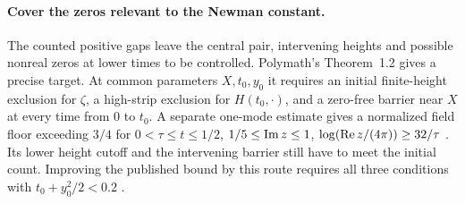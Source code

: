 \paragraph{Cover the zeros relevant to the Newman constant.}
The counted positive gaps leave the central pair, intervening heights
and possible nonreal zeros at lower times to be controlled. Polymath's
Theorem~1.2 gives a precise target. At common parameters \(X,t_0,y_0\)
it requires an initial finite-height exclusion for \(\zeta\), a high-strip
exclusion for \(H(t_0,\cdot)\), and a zero-free barrier near \(X\) at
every time from \(0\) to \(t_0\). A separate one-mode estimate gives a
normalized field floor exceeding \(3/4\) for \(0<\tau\le t\le1/2\),
\(1/5\le\operatorname{Im} z\le1\), \(\log(\operatorname{Re} z/(4\pi))\ge32/\tau\)
\cite{EZStrip}. Its lower height cutoff and the intervening barrier
still have to meet the initial count. Improving the published bound by
this route requires all three conditions with \(t_0+y_0^2/2<0.2\)
\cite[Theorem~1.2]{Polymath2019}\cite[Corollary~2]{PlattTrudgian2021}.
